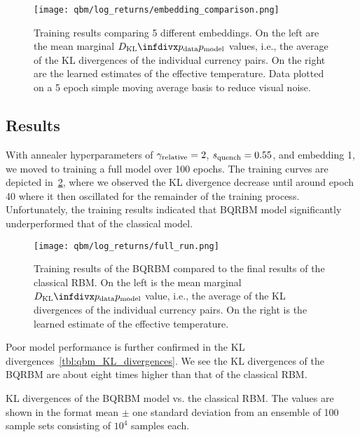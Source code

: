 \begin{figure}[!htb]
    \begin{center}
        \texttt{[image: qbm/log\_returns/embedding\_comparison.png]}
    \end{center}
    \caption{
        Training results comparing 5 different embeddings.
        On the left are the mean marginal \( \DKL{\pdata}{\pmodel} \) values, i.e., the average of the KL divergences of the individual currency pairs.
        On the right are the learned estimates of the effective temperature.
        Data plotted on a 5 epoch simple moving average basis to reduce visual noise.
    }
    \label{fig:qbm_log_returns_embedding_comparison}
\end{figure}

\subsection{Results}\label{sec:qbm_log_returns_results}
With annealer hyperparameters of \( \gamma_{\text{relative}} = 2 \), \( s_{\text{quench}} = 0.55 \), and embedding 1, we moved to training a full model over 100 epochs.
The training curves are depicted in~\cref{fig:qbm_log_returns_full_run}, where we observed the KL divergence decrease until around epoch 40 where it then oscillated for the remainder of the training process.
Unfortunately, the training results indicated that BQRBM model significantly underperformed that of the classical model.

\begin{figure}[!htb]
    \begin{center}
        \texttt{[image: qbm/log\_returns/full\_run.png]}
    \end{center}
    \caption{
        Training results of the BQRBM compared to the final results of the classical RBM.
        On the left is the mean marginal \( \DKL{\pdata}{\pmodel} \) value, i.e., the average of the KL divergences of the individual currency pairs.
        On the right is the learned estimate of the effective temperature.
    }
    \label{fig:qbm_log_returns_full_run}
\end{figure}

Poor model performance is further confirmed in the KL divergences~\cref{tbl:qbm_KL_divergences}.
We see the KL divergences of the BQRBM are about eight times higher than that of the classical RBM.
\begin{table}[!htb]
    \centering
    \begin{adjustbox}{max width=\textwidth}
        
    \end{adjustbox}
    \caption{
        KL divergences of the BQRBM model vs. the classical RBM.
        The values are shown in the format mean \(\pm\) one standard deviation from an ensemble of 100 sample sets consisting of \( 10^4 \) samples each.
}
    \label{tbl:qbm_KL_divergences}
\end{table}

